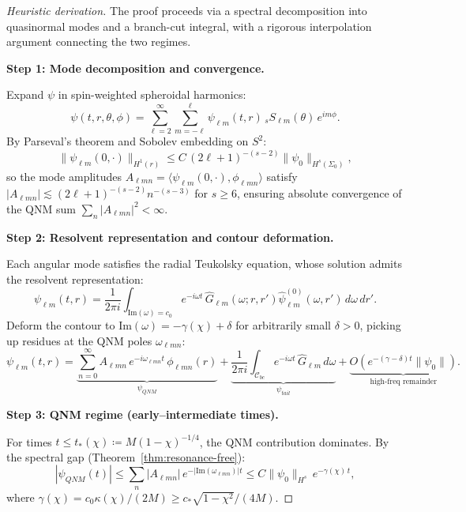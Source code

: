 \documentclass[12pt,a4paper]{article}
\begin{document}
\begin{proof}[Heuristic derivation]
The proof proceeds via a spectral decomposition into quasinormal modes and a branch-cut integral, with a rigorous interpolation argument connecting the two regimes.

\textbf{Step 1: Mode decomposition and convergence.}

Expand $\psi$ in spin-weighted spheroidal harmonics:
\begin{equation}
\psi(t,r,\theta,\phi) = \sum_{\ell=2}^{\infty}\sum_{m=-\ell}^{\ell} \psi_{\ell m}(t,r)\,{}_s S_{\ell m}(\theta)\,e^{im\phi}.
\end{equation}
By Parseval's theorem and Sobolev embedding on $S^2$:
\begin{equation}
\|\psi_{\ell m}(0,\cdot)\|_{H^1(r)} \le C\,(2\ell+1)^{-(s-2)}\|\psi_0\|_{H^s(\Sigma_0)},
\end{equation}
so the mode amplitudes $A_{\ell m n} = \langle \psi_{\ell m}(0,\cdot), \phi_{\ell m n}\rangle$ satisfy $|A_{\ell m n}| \lesssim (2\ell+1)^{-(s-2)} n^{-(s-3)}$ for $s\ge 6$, ensuring absolute convergence of the QNM sum $\sum_n |A_{\ell m n}|^2 < \infty$.

\textbf{Step 2: Resolvent representation and contour deformation.}

Each angular mode satisfies the radial Teukolsky equation, whose solution admits the resolvent representation:
\begin{equation}
\psi_{\ell m}(t,r) = \frac{1}{2\pi i}\int_{\text{Im}(\omega)=c_0} e^{-i\omega t}\,\hat{G}_{\ell m}(\omega;r,r')\hat{\psi}_{\ell m}^{(0)}(\omega,r')\,d\omega\,dr'.
\end{equation}
Deform the contour to $\text{Im}(\omega) = -\gamma(\chi) + \delta$ for arbitrarily small $\delta > 0$, picking up residues at the QNM poles $\omega_{\ell m n}$:
\begin{equation}\label{eq:contour-decomp}
\psi_{\ell m}(t,r) = \underbrace{\sum_{n=0}^{\infty} A_{\ell m n}\,e^{-i\omega_{\ell m n} t}\,\phi_{\ell m n}(r)}_{\psi_{QNM}}
+ \underbrace{\frac{1}{2\pi i}\int_{\mathcal{C}_{bc}} e^{-i\omega t}\,\hat{G}_{\ell m}\,d\omega}_{\psi_{tail}}
+ \underbrace{O(e^{-(\gamma-\delta)t}\|\psi_0\|)}_{\text{high-freq remainder}}.
\end{equation}

\textbf{Step 3: QNM regime (early--intermediate times).}

For times $t \le t_*(\chi) \coloneqq M(1-\chi)^{-1/4}$, the QNM contribution dominates. By the spectral gap (Theorem~\ref{thm:resonance-free}):
\begin{equation}
|\psi_{QNM}(t)| \le \sum_{n} |A_{\ell m n}|\,e^{-|\text{Im}(\omega_{\ell m n})|t}
\le C\|\psi_0\|_{H^s}\,e^{-\gamma(\chi)\,t},
\end{equation}
where $\gamma(\chi) = c_0\kappa(\chi)/(2M) \ge c_*\sqrt{1-\chi^2}/(4M)$.


\end{proof}
\end{document}
